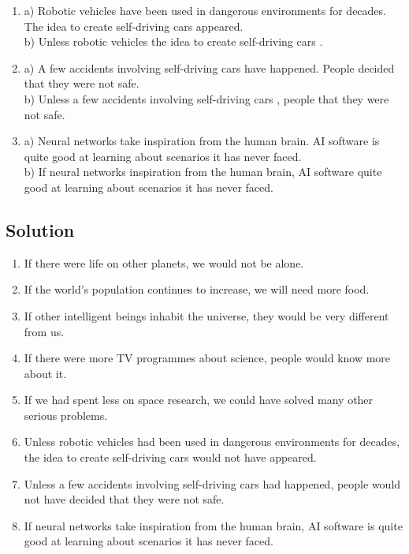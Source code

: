 \begin{enumerate}
      \item a) Robotic vehicles have been used in dangerous environments for decades. The idea to create self-driving cars appeared. \\
            b) Unless robotic vehicles \underline{\hspace{2cm}} the idea to create self-driving cars \underline{\hspace{2cm}}.

      \item a) A few accidents involving self-driving cars have happened. People decided that they were not safe. \\
            b) Unless a few accidents involving self-driving cars \underline{\hspace{2cm}}, people \underline{\hspace{2cm}} that they were not safe.

      \item a) Neural networks take inspiration from the human brain. AI software is quite good at learning about scenarios it has never faced. \\
            b) If neural networks \underline{\hspace{2cm}} inspiration from the human brain, AI software \underline{\hspace{2cm}} quite good at learning about scenarios it has never faced.

\end{enumerate}

\subsection*{Solution}
\begin{enumerate}
      \item If there were life on other planets, we would not be alone.
      \item If the world’s population continues to increase, we will need more food.
      \item If other intelligent beings inhabit the universe, they would be very different from us.
      \item If there were more TV programmes about science, people would know more about it.
      \item If we had spent less on space research, we could have solved many other serious problems.
      \item Unless robotic vehicles had been used in dangerous environments for decades, the idea to create self-driving cars would not have appeared.
      \item Unless a few accidents involving self-driving cars had happened, people would not have decided that they were not safe.
      \item If neural networks take inspiration from the human brain, AI software is quite good at learning about scenarios it has never faced.
\end{enumerate}

